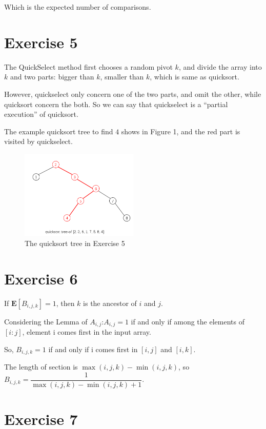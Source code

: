 \documentclass[
]{article}
\begin{document}
Which is the expected number of comparisons.

\hypertarget{exercise-5}{%
\section{Exercise 5}\label{exercise-5}}

The QuickSelect method first chooses a random pivot \(k\), and divide
the array into \(k\) and two parts: bigger than \(k\), smaller than
\(k\), which is same as quicksort.

However, quickselect only concern one of the two parts, and omit the
other, while quicksort concern the both. So we can say that quickselect
is a ``partial execution'' of quicksort.

The example quicksort tree to find \(4\) shows in Figure 1, and the red
part is visited by quickselect.

\begin{figure}
\centering
\includegraphics[width=0.5\textwidth,height=\textheight]{1.png}
\caption{The quicksort tree in Exercise 5}
\end{figure}

\hypertarget{exercise-6}{%
\section{Exercise 6}\label{exercise-6}}

If \(\mathbf{E}[B_{i,j,k}]=1\), then \(k\) is the ancestor of \(i\) and
\(j\).

Considering the Lemma of \(A_{i,j}\):\(A_{i,j}=1\) if and only if among
the elements of \([i:j]\), element i comes first in the input array.

So, \(B_{i,j,k}=1\) if and only if i comes first in \([i,j]\) and
\([i,k]\).

The length of section is \(\max(i,j,k)-\min(i,j,k)\), so
\(B_{i,j,k}=\dfrac{1}{\max(i,j,k)-\min(i,j,k)+1}\).

\hypertarget{exercise-7}{%
\section{Exercise 7}\label{exercise-7}}
\end{document}
